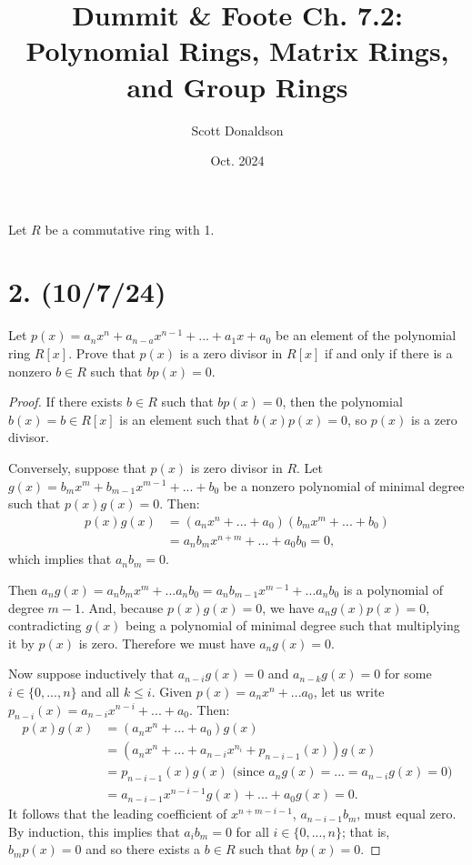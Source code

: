 \documentclass{article}
\title{Dummit \& Foote Ch. 7.2: Polynomial Rings, Matrix Rings, and Group Rings}
\author{Scott Donaldson}
\date{Oct. 2024}
\begin{document}
\maketitle

Let $R$ be a commutative ring with 1.

\section*{2. (10/7/24)}

Let $p(x) = a_n x^n + a_{n - a} x^{n - 1} + ... + a_1 x + a_0$ be an element of the polynomial ring $R[x]$. Prove that $p(x)$ is a zero divisor in $R[x]$ if and only if there is a nonzero $b \in R$ such that $bp(x) = 0$.

\begin{proof}
    If there exists $b \in R$ such that $bp(x) = 0$, then the polynomial $b(x) = b \in R[x]$ is an element such that $b(x)p(x) = 0$, so $p(x)$ is a zero divisor.

    Conversely, suppose that $p(x)$ is zero divisor in $R$. Let $g(x) = b_m x^m + b_{m - 1} x^{m - 1} + ... + b_0$ be a nonzero polynomial of minimal degree such that $p(x) g(x) = 0$. Then:
    \begin{align*}
        p(x) g(x) &= (a_n x^n + ... + a_0)(b_m x^m + ... + b_0) \\
        &= a_n b_m x^{n + m} + ... + a_0 b_0 = 0,
    \end{align*}
    which implies that $a_n b_m = 0$.

    Then $a_n g(x) = a_n b_m x^m + ... a_n b_0 = a_n b_{m - 1} x^{m - 1} + ... a_n b_0$ is a polynomial of degree $m - 1$. And, because $p(x) g(x) = 0$, we have $a_n g(x) p(x) = 0$, contradicting $g(x)$ being a polynomial of minimal degree such that multiplying it by $p(x)$ is zero. Therefore we must have $a_n g(x) = 0$.

    Now suppose inductively that $a_{n - i} g(x) = 0$ and $a_{n - k} g(x) = 0$ for some $i \in \{ 0, ..., n \}$ and all $k \leq i$. Given $p(x) = a_n x^n + ... a_0$, let us write $p_{n - i}(x) = a_{n - i} x^{n - i} + ... + a_0$. Then:
    \begin{align*}
        p(x) g(x) &= (a_n x^n + ... + a_0)g(x) \\
        &= (a_n x^n + ... + a_{n - i} x^{n _ i} + p_{n - i - 1}(x))g(x) \\
        &= p_{n - i - 1}(x)g(x) \text{ (since } a_n g(x) = ... = a_{n - i} g(x) = 0 \text{)} \\
        &= a_{n - i - 1}x^{n - i - 1}g(x) + ... + a_0 g(x) = 0.
    \end{align*}
    It follows that the leading coefficient of $x^{n + m - i - 1}$, $a_{n - i - 1} b_m$, must equal zero. By induction, this implies that $a_i b_m = 0$ for all $i \in \{ 0, ..., n \}$; that is, $b_m p(x) = 0$ and so there exists a $b \in R$ such that $bp(x) = 0$.
\end{proof}
\end{document}
